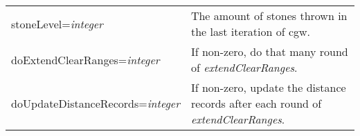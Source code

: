 \documentclass[twoside,11pt]{article}
\begin{document}
\begin{tabular}{lp{4.0in}}
stoneLevel={\it integer} &
The amount of stones thrown in the last iteration of cgw.
\\

doExtendClearRanges={\it integer} &
If non-zero, do that many round of {\it extendClearRanges}.
\\

doUpdateDistanceRecords={\it integer} &
If non-zero, update the distance records after each round of {\it extendClearRanges}.
\\
\end{tabular}
\end{document}

